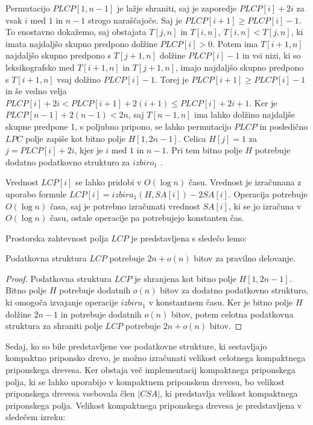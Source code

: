 Permutacijo $PLCP[1,n-1]$ je lažje shraniti, saj je zaporedje $PLCP[i]+2i$ za vsak $i$ med $1$ in $n-1$ strogo naraščajoče. Saj je $PLCP[i+1]\ge PLCP[i]-1$. To enostavno dokažemo, saj obstajata $T[j,n]$ in $T[i,n]$, $T[i,n]<T[j,n]$, ki imata najdaljšo skupno predpono dolžine $PLCP[i]>0$. Potem ima $T[i+1,n]$ najdaljšo skupno predpono s $T[j+1,n]$ dolžine $PLCP[i]-1$ in vsi nizi, ki so leksikografsko med $T[i+1,n]$ in $T[j+1,n]$, imajo najdaljšo skupno predpono s $T[i+1,n]$ vsaj dolžino $PLCP[i]-1$. Torej je $PLCP[i+1]\ge PLCP[i]-1$ in še vedno velja $PLCP[i]+2i<PLCP[i+1]+2(i+1)\le PLCP[i]+2i+1$. Ker je $PLCP[n-1]+2(n-1)< 2n$, saj $T[n-1,n]$ ima lahko dolžino najdaljše skupne predpone 1, s poljubno pripono, se lahko permutacijo $PLCP$ in posledično $LPC$ polje zapiše kot bitno polje $H[1,2n-1]$. Celica $H[j]=1$ za $j=PLCP[i]+2i$, kjer je $i$ med $1$ in $n-1$. Pri tem bitno polje $H$ potrebuje dodatno podatkovno strukturo za $izbiro_1$ \cite{Navarro2016}.

Vrednost $LCP[i]$ se lahko pridobi v $O(\log{n})$ času. Vrednost je izračunana z uporabo formule $LCP[i]=izbira_1(H,SA[i])-2SA[i]$. Operacija potrebuje $O(\log{n})$ časa, saj je potrebno izračunati vrednost $SA[i]$, ki se jo izračuna v $O(\log{n})$ času, ostale operacije pa potrebujejo konstanten čas. 

Prostorska zahtevnost polja $LCP$ je predstavljena s sledečo lemo:

\begin{lema}\label{lema:LCP}
 Podatkovna struktura $LCP$ potrebuje $2n+o(n)$ bitov za pravilno delovanje.
\end{lema}

\begin{proof}
    Podatkovna struktura $LCP$ je shranjena kot bitno polje $H[1,2n-1]$. Bitno polje $H$ potrebuje dodatnih $o(n)$ bitov za dodatno podatkovno strukturo, ki omogoča izvajanje operacije $izbira_1$ v konstantnem času. Ker je bitno polje $H$ dolžine $2n-1$ in potrebuje dodatnih $o(n)$ bitov, potem celotna podatkovna struktura za shraniti polje $LCP$ potrebuje $2n+o(n)$ bitov.
\end{proof}

Sedaj, ko so bile predstavljene vse podatkovne strukture, ki sestavljajo kompaktno priponsko drevo, je možno izračunati velikost celotnega kompaktnega priponskega drevesa. Ker obstaja več implementacij kompaktnega priponskega polja, ki se lahko uporabijo v kompaktnem priponskem drevesu, bo velikost priponskega drevesa vsebovala člen $|CSA|$, ki predstavlja velikost kompaktnega priponskega polja. Velikost kompaktnega priponskega drevesa je predstavljena v sledečem izreku:

